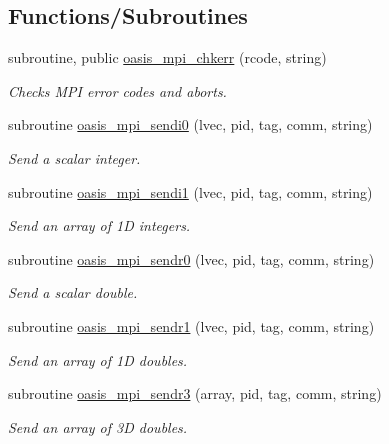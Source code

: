 \subsection*{Functions/\+Subroutines}
\begin{DoxyCompactItemize}
\item 
subroutine, public \hyperlink{namespacemod__oasis__mpi_a15ba68764a1f4dd07d403e46afae824c}{oasis\+\_\+mpi\+\_\+chkerr} (rcode, string)
\begin{DoxyCompactList}\small\item\em Checks M\+PI error codes and aborts. \end{DoxyCompactList}\item 
subroutine \hyperlink{namespacemod__oasis__mpi_aa5078962eee157f52878f711c0a29afb}{oasis\+\_\+mpi\+\_\+sendi0} (lvec, pid, tag, comm, string)
\begin{DoxyCompactList}\small\item\em Send a scalar integer. \end{DoxyCompactList}\item 
subroutine \hyperlink{namespacemod__oasis__mpi_aab4cc0d2b50e8e73697e6d88d23b03cd}{oasis\+\_\+mpi\+\_\+sendi1} (lvec, pid, tag, comm, string)
\begin{DoxyCompactList}\small\item\em Send an array of 1D integers. \end{DoxyCompactList}\item 
subroutine \hyperlink{namespacemod__oasis__mpi_ab38f15fbce57555ea66ccbc1aa477dd1}{oasis\+\_\+mpi\+\_\+sendr0} (lvec, pid, tag, comm, string)
\begin{DoxyCompactList}\small\item\em Send a scalar double. \end{DoxyCompactList}\item 
subroutine \hyperlink{namespacemod__oasis__mpi_a948cd001c0955ae19f4b410d4cca9f9b}{oasis\+\_\+mpi\+\_\+sendr1} (lvec, pid, tag, comm, string)
\begin{DoxyCompactList}\small\item\em Send an array of 1D doubles. \end{DoxyCompactList}\item 
subroutine \hyperlink{namespacemod__oasis__mpi_ac8809a8b29b3ffa246612b9c25cd05eb}{oasis\+\_\+mpi\+\_\+sendr3} (array, pid, tag, comm, string)
\begin{DoxyCompactList}\small\item\em Send an array of 3D doubles. \end{DoxyCompactList}\item 

\end{DoxyCompactItemize}
